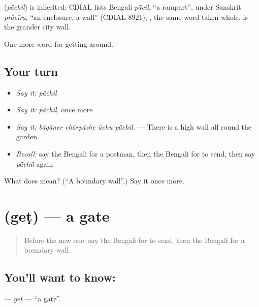 \begin{cousinweb}
\textbf{} (\emph{pā̃chil}) is inherited: CDIAL lists Bengali \emph{pā̃cil}, \textquotedblleft{}a rampart\textquotedblright{}, under Sanskrit \emph{prācīra}, \textquotedblleft{}an enclosure, a wall\textquotedblright{} (CDIAL 8921); , the same word taken whole, is the grander city wall.
\end{cousinweb}

\begin{grammarlens}[title={What you've built}]
One more word for getting around.
\end{grammarlens}

\subsection*{Your turn}
\begin{itemize}
\raggedright
  \item \emph{Say it:} \emph{pā̃chil}
  \item \emph{Say it:} \emph{pā̃chil}, once more
  \item \emph{Say it:} \emph{bāgāner chārpāshe ũchu pā̃chil.} — There is a high wall all round the garden.
  \item \emph{Recall:} say the Bengali for a postman, then the Bengali for to send, then say \emph{pā̃chil} again
\end{itemize}

\begin{tcolorbox}[breakable,colback=teal!4,colframe=teal!35!black,title={Before you move on}]
What does  mean? (\textquotedblleft{}A boundary wall\textquotedblright{}.) Say it once more.
\end{tcolorbox}
\section[\texorpdfstring{\bn{গেট} (geṭ)}{গেট (geṭ)}]{ (geṭ) — a gate}

\label{lesson:BN-C412-get}



\begin{quote}
Before the new one: say the Bengali for to send, then the Bengali for a boundary wall.
\end{quote}

\subsection*{You'll want to know: }
\textbf{} — \emph{geṭ} — \textquotedblleft{}a gate\textquotedblright{}.

